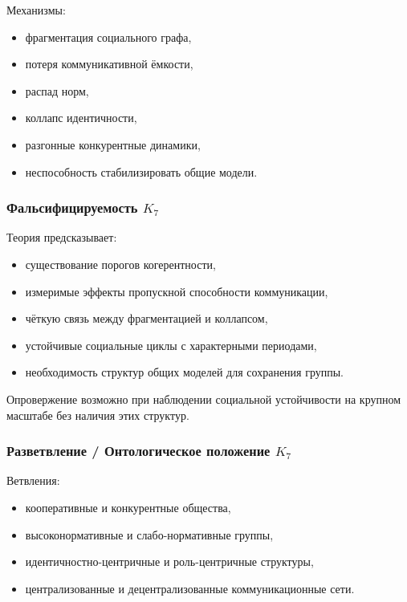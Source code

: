 Механизмы:
\begin{itemize}
    \item фрагментация социального графа,
    \item потеря коммуникативной ёмкости,
    \item распад норм,
    \item коллапс идентичности,
    \item разгонные конкурентные динамики,
    \item неспособность стабилизировать общие модели.
\end{itemize}

\subsubsection{Фальсифицируемость \texorpdfstring{$K_7$}{K_7}}

Теория предсказывает:
\begin{itemize}
    \item существование порогов когерентности,
    \item измеримые эффекты пропускной способности коммуникации,
    \item чёткую связь между фрагментацией и коллапсом,
    \item устойчивые социальные циклы с характерными периодами,
    \item необходимость структур общих моделей для сохранения группы.
\end{itemize}

Опровержение возможно при наблюдении социальной устойчивости на
крупном масштабе без наличия этих структур.

\subsubsection{Разветвление / Онтологическое положение \texorpdfstring{$K_7$}{K_7}}

Ветвления:
\begin{itemize}
    \item кооперативные и конкурентные общества,
    \item высоконормативные и слабо-нормативные группы,
    \item идентичностно-центричные и роль-центричные структуры,
    \item централизованные и децентрализованные коммуникационные сети.
\end{itemize}

